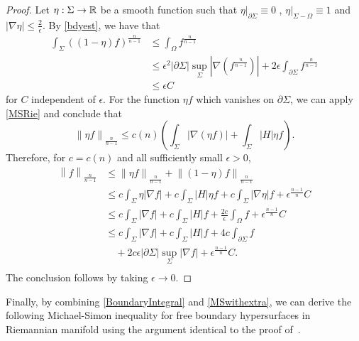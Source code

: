 \begin{proof}
    Let $\eta : \Sigma \to \mathbb{R}$ be a smooth function such that $\eta |_{\partial \Sigma } \equiv 0$ , $\eta |_{ \Sigma - \Omega } \equiv 1$ and $\left| \nabla \eta  \right| \leq \frac{2}{\epsilon }$. By \autoref{bdyest}, we have that 
    \begin{equation*}
    \begin{split}
        \int_{\Sigma} \left( \left( 1-\eta  \right) f \right) ^{\frac{n}{n-1}}
    &\leq \int_{\Omega }^{} f_{}^{\frac{n}{n-1}}   \\
    &\leq \epsilon ^2 \left| \partial \Sigma  \right| \sup _{\Sigma }\left| \nabla \left( f_{}^{\frac{n}{n-1}} \right)  \right| +2 \epsilon \int_{\partial \Sigma} f_{}^{\frac{n}{n-1}} \\
    &\leq \epsilon C
    \end{split}
    \end{equation*}
    for $C$ independent of $\epsilon $. For the function $\eta f$ which vanishes on $\partial \Sigma $, we can apply \autoref{MSRie} and conclude that 
    \[\left\| \eta  f \right\| _{\frac{n}{n-1}} \leq  c(n) \left( \int_{\Sigma} \left| \nabla (\eta f) \right| + \int_{\Sigma} \left| H  \right|\eta f  \right). \] 
    Therefore, for $c=c(n)$ and all sufficiently small $\epsilon >0$,
    \begin{equation*}
    \begin{split}
        \left\| f \right\| _{\frac{n}{n-1}} 
    &\leq \left\| \eta  f \right\| _{\frac{n}{n-1}}+\left\| (1-\eta )f \right\| _{\frac{n}{n-1}}  \\
    & \leq c \int_{\Sigma} \eta \left| \nabla f \right| +c \int_{\Sigma} \left| H \right| \eta f + c \int_{\Sigma} \left| \nabla \eta  \right| f + \epsilon ^{\frac{n-1}{n}}C\\
    &\leq c \int_{\Sigma}  \left| \nabla f \right| +c \int_{\Sigma} \left| H \right| f + \frac{2c}{\epsilon } \int_{\Omega }  f + \epsilon ^{\frac{n-1}{n}}C\\
    &\leq c \int_{\Sigma}  \left| \nabla f \right| +c \int_{\Sigma} \left| H \right| f +4c \int_{\partial \Sigma} f\\
    &\quad + 2c \epsilon  \left| \partial \Sigma  \right| \sup _{\Sigma }\left| \nabla f \right|+ \epsilon ^{\frac{n-1}{n}}C.\\
    \end{split}
    \end{equation*}
    The conclusion follows by taking $\epsilon \to 0$.
\end{proof}

Finally, by combining \autoref{BoundaryIntegral} and \autoref{MSwithextra}, we can derive the following Michael-Simon inequality for free boundary hypersurfaces in Riemannian manifold using the argument identical to the proof of~\cite[Theorem 2.3]{edelen_convexity_2016}.


